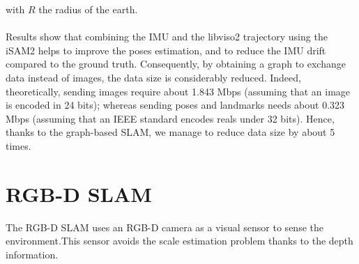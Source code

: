 \documentclass[11pt,openany]{book}
\begin{document}
with $R$ the radius of the earth.\\\\
Results show that combining the IMU and the libviso2 trajectory using the iSAM2 helps to improve the poses estimation, and to reduce the IMU drift compared to the ground truth. Consequently, by obtaining a graph to exchange data instead of images, the data size is considerably reduced. Indeed, theoretically, sending images require about 1.843 Mbps (assuming that an image is encoded in 24 bits); whereas sending poses and landmarks needs about 0.323 Mbps (assuming that an IEEE standard encodes reals under 32 bits). Hence, thanks to the graph-based SLAM, we manage to reduce data size by about 5 times.
\section{RGB-D SLAM}
The RGB-D SLAM uses an RGB-D camera as a visual sensor to sense the environment.This sensor avoids the scale estimation problem thanks to the depth information.
\end{document}

